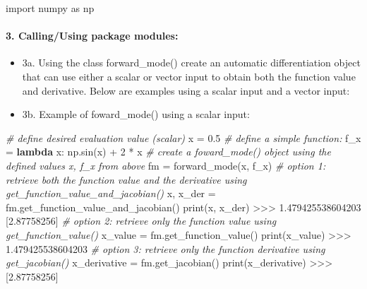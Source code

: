 \documentclass[11pt]{article}
\newenvironment{Shaded}{}{}
\newcommand{\KeywordTok}[1]{\textcolor[rgb]{0.00,0.44,0.13}{\textbf{{#1}}}}
\newcommand{\DecValTok}[1]{\textcolor[rgb]{0.25,0.63,0.44}{{#1}}}
\newcommand{\FloatTok}[1]{\textcolor[rgb]{0.25,0.63,0.44}{{#1}}}
\newcommand{\CommentTok}[1]{\textcolor[rgb]{0.38,0.63,0.69}{\textit{{#1}}}}
\newcommand{\NormalTok}[1]{{#1}}
\newcommand{\ImportTok}[1]{{#1}}
\newcommand{\OperatorTok}[1]{\textcolor[rgb]{0.40,0.40,0.40}{{#1}}}
\newcommand{\BuiltInTok}[1]{{#1}}
\begin{document}
\begin{Shaded}
\begin{Highlighting}[]
\ImportTok{import}\NormalTok{ numpy }\ImportTok{as}\NormalTok{ np}
\end{Highlighting}
\end{Shaded}

\hypertarget{callingusing-package-modules}{%
\paragraph{\texorpdfstring{3. \textbf{Calling/Using package
modules:}}{3. Calling/Using package modules:}}\label{callingusing-package-modules}}

\begin{itemize}
\item
  3a. Using the class forward\_mode() create an automatic
  differentiation object that can use either a scalar or vector input to
  obtain both the function value and derivative. Below are examples
  using a scalar input and a vector input:
\item
  3b. Example of foward\_mode() using a scalar input:
\end{itemize}

\begin{Shaded}
\begin{Highlighting}[]
\CommentTok{# define desired evaluation value (scalar)}
\NormalTok{x }\OperatorTok{=} \FloatTok{0.5}
\CommentTok{# define a simple function:}
\NormalTok{f_x }\OperatorTok{=} \KeywordTok{lambda}\NormalTok{ x: np.sin(x) }\OperatorTok{+} \DecValTok{2} \OperatorTok{*}\NormalTok{ x}
\CommentTok{# create a foward_mode() object using the defined values x, f_x from above}
\NormalTok{fm }\OperatorTok{=}\NormalTok{ forward_mode(x, f_x)}
\CommentTok{# option 1: retrieve both the function value and the derivative using get_function_value_and_jacobian()}
\NormalTok{x, x_der }\OperatorTok{=}\NormalTok{ fm.get_function_value_and_jacobian()}
\BuiltInTok{print}\NormalTok{(x, x_der)}
\OperatorTok{>>>} \FloatTok{1.479425538604203}
\NormalTok{    [}\FloatTok{2.87758256}\NormalTok{]}
\CommentTok{# option 2: retrieve only the function value using get_function_value()}
\NormalTok{x_value }\OperatorTok{=}\NormalTok{ fm.get_function_value()}
\BuiltInTok{print}\NormalTok{(x_value)}
\OperatorTok{>>>} \FloatTok{1.479425538604203}
\CommentTok{# option 3: retrieve only the function derivative using get_jacobian()}
\NormalTok{x_derivative }\OperatorTok{=}\NormalTok{ fm.get_jacobian()}
\BuiltInTok{print}\NormalTok{(x_derivative)}
\OperatorTok{>>>}\NormalTok{ [}\FloatTok{2.87758256}\NormalTok{]}
\end{Highlighting}
\end{Shaded}
\end{document}
